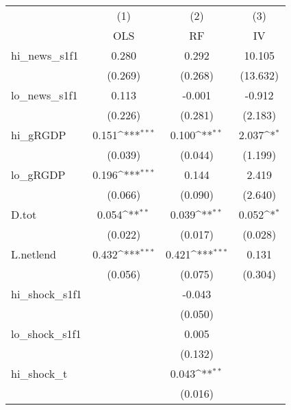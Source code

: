 {
\def\sym#1{\ifmmode^{#1}\else\(^{#1}\)\fi}
\begin{tabular}{l*{3}{c}}
\toprule
            &\multicolumn{1}{c}{(1)}&\multicolumn{1}{c}{(2)}&\multicolumn{1}{c}{(3)}\\
            &\multicolumn{1}{c}{OLS}&\multicolumn{1}{c}{RF}&\multicolumn{1}{c}{IV}\\
\midrule
hi\_news\_s1f1&       0.280         &       0.292         &      10.105         \\
            &     (0.269)         &     (0.268)         &    (13.632)         \\
\addlinespace
lo\_news\_s1f1&       0.113         &      -0.001         &      -0.912         \\
            &     (0.226)         &     (0.281)         &     (2.183)         \\
\addlinespace
hi\_gRGDP    &       0.151\sym{***}&       0.100\sym{**} &       2.037\sym{*}  \\
            &     (0.039)         &     (0.044)         &     (1.199)         \\
\addlinespace
lo\_gRGDP    &       0.196\sym{***}&       0.144         &       2.419         \\
            &     (0.066)         &     (0.090)         &     (2.640)         \\
\addlinespace
D.tot       &       0.054\sym{**} &       0.039\sym{**} &       0.052\sym{*}  \\
            &     (0.022)         &     (0.017)         &     (0.028)         \\
\addlinespace
L.netlend   &       0.432\sym{***}&       0.421\sym{***}&       0.131         \\
            &     (0.056)         &     (0.075)         &     (0.304)         \\
\addlinespace
hi\_shock\_s1f1&                     &      -0.043         &                     \\
            &                     &     (0.050)         &                     \\
\addlinespace
lo\_shock\_s1f1&                     &       0.005         &                     \\
            &                     &     (0.132)         &                     \\
\addlinespace
hi\_shock\_t  &                     &       0.043\sym{**} &                     \\
            &                     &     (0.016)         &                     \\

\end{tabular}}
